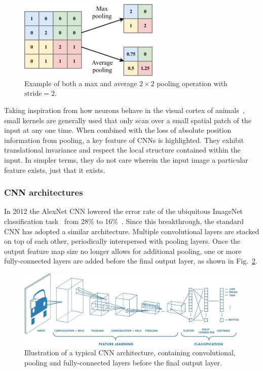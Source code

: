 \begin{figure} %
    \includegraphics[width=0.6\textwidth]{diagrams/6-cvn/pooling.pdf}
    \caption[Example of pooling operation.]
    {Example of both a max and average $2 \times 2$ pooling operation with $\mathrm{stride}=2$.}
    \label{fig:pooling}
\end{figure}

Taking inspiration from how neurons behave in the visual cortex of animals~\cite{lecun2015}, small
kernels are generally used that only scan over a small spatial patch of the input at any one time.
When combined with the loss of absolute position information from pooling, a key feature of CNNs
is highlighted. They exhibit translational invariance and respect the local structure contained
within the input. In simpler terms, they do not care wherein the input image a particular feature
exists, just that it exists.

\subsubsection*{CNN architectures}

In 2012 the AlexNet CNN lowered the error rate of the ubiquitous ImageNet classification
task~\cite{deng2009} from 28\% to 16\%~\cite{krizhevsky2012}. Since this breakthrough, the
standard CNN has adopted a similar architecture. Multiple convolutional layers are stacked on top
of each other, periodically interspersed with pooling layers. Once the output feature map size no
longer allows for additional pooling, one or more fully-connected layers are added before the
final output layer, as shown in Fig.~\ref{fig:conv_diagram}.

\begin{figure} %
    \includegraphics[width=\textwidth]{diagrams/6-cvn/conv_diagram.jpeg}
    \caption[Typical CNN architecture]
    {Illustration of a typical CNN architecture, containing convolutional, pooling and
        fully-connected layers before the final output layer.}
    \label{fig:conv_diagram}
\end{figure}

